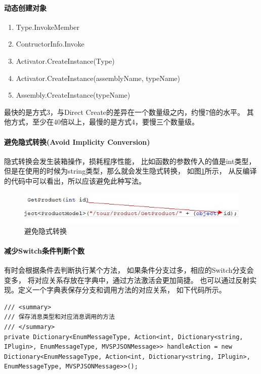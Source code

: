 \documentclass{book}
\begin{document}
\paragraph{动态创建对象}

\begin{enumerate}
	\setcounter{enumi}{0}
	\item{Type.InvokeMember}
	\item{ContructorInfo.Invoke}
	\item{Activator.CreateInstance(Type)}
	\item{Activator.CreateInstance(assemblyName, typeName)}
	\item{Assembly.CreateInstance(typeName)}
\end{enumerate}

最快的是方式3，与Direct Create的差异在一个数量级之内，约慢7倍的水平。
其他方式，至少在40倍以上，最慢的是方式4，要慢三个数量级。 




\paragraph{避免隐式转换(Avoid Implicity Conversion)}

隐式转换会发生装箱操作，损耗程序性能，
比如函数的参数传入的值是int类型，
但是在使用的时候为string类型，那么就会发生隐式转换，
如图\ref{fig:AvoidUsingImplicityConvert}所示，
从反编译的代码中可以看出，所以应该避免此种写法。

\begin{figure}[htbp]
	\centering
	\includegraphics[scale=0.8]{AvoidUsingImplicityConvert.jpg}
	\caption{避免隐式转换}
	\label{fig:AvoidUsingImplicityConvert}
\end{figure}

\paragraph{减少Switch条件判断个数}

有时会根据条件去判断执行某个方法，
如果条件分支过多，相应的Switch分支会变多，
将对应关系存放在字典中，通过方法激活会更加简捷。
也可以通过反射实现。定义一个字典表保存分支和调用方法的对应关系，
如下代码所示。

\begin{lstlisting}[language={[Sharp]C}]
/// <summary>
/// 保存消息类型和对应消息调用的方法
/// </summary>
private Dictionary<EnumMessageType, Action<int, Dictionary<string, IPlugin>, EnumMessageType, MVSPJSONMessage>> handleAction = new Dictionary<EnumMessageType, Action<int, Dictionary<string, IPlugin>, EnumMessageType, MVSPJSONMessage>>();
\end{lstlisting}
\end{document}
